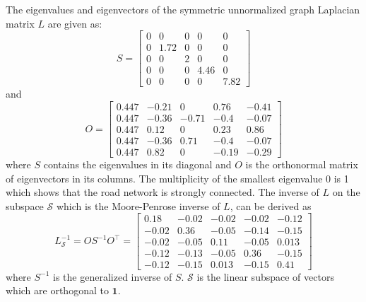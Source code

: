 \documentclass[b5paper,12pt]{report}
\theoremstyle{definition}
\begin{document}
The eigenvalues and eigenvectors of the symmetric unnormalized graph Laplacian matrix $L$ are given as:
\begin{equation*}
    S = \begin{bmatrix} 0 & 0 & 0 & 0 & 0 \\ 
    0 & 1.72 &0&0&0 \\ 0&0&  2 &0&0 \\ 
    0&0&0&  4.46 &0\\
    0&0&0&0&7.82 \end{bmatrix}
\end{equation*} 
and
\begin{equation*}
    O = \begin{bmatrix} 0.447 & -0.21 & 0 &  0.76 &  -0.41 \\
    0.447 & -0.36 &  -0.71 &   -0.4 & -0.07 \\
    0.447 &  0.12 &   0 & 0.23 & 0.86 \\
    0.447 &  -0.36 &  0.71 &   -0.4 & -0.07 \\
    0.447 & 0.82 &  0 &  -0.19 & -0.29 \end{bmatrix}
\end{equation*}
where $S$ contains the eigenvalues in its diagonal and $O$ is the orthonormal matrix of eigenvectors in its columns. The multiplicity of the smallest eigenvalue 0 is 1 which shows that the road network is strongly connected. The inverse of $L$ on the subspace $\mathcal{S}$ which is the Moore-Penrose inverse of $L$, can be derived as
\[
    L_{\mathcal{S}}^{-1} = O S^{-1} O^\top = \begin{bmatrix}  
    0.18 &  -0.02 & -0.02 & -0.02 & -0.12 \\
    -0.02 &  0.36 & -0.05 & -0.14 & -0.15 \\
    -0.02 & -0.05 &  0.11 & -0.05 & 0.013 \\
     -0.12 & -0.13 & -0.05 & 0.36 & -0.15 \\
    -0.12 & -0.15 & 0.013 & -0.15 &  0.41 \end{bmatrix}
\]
where $S^{-1}$ is the generalized inverse of $S$. $\mathcal{S}$ is the linear subspace of vectors which are orthogonal to $\textbf{1}$.
\end{document}

